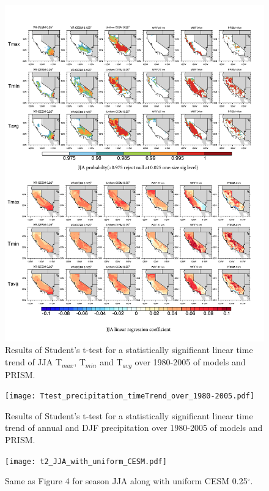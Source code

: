 \documentclass[draft,ms]{agutexSI}
\begin{document}
\begin{figure}
\begin{center}
\includegraphics[width=6in]{Ttest_JJAT2_timeTrend_over_1980-2005.pdf}
\caption{Results of Student's t-test for a statistically significant linear time trend of JJA T$_{max}$, T$_{min}$ and T$_{avg}$ over 1980-2005 of models and PRISM.}
\end{center}
\end{figure}

\begin{figure}
\begin{center}
\texttt{[image: Ttest\_precipitation\_timeTrend\_over\_1980-2005.pdf]}
\caption{Results of Student's t-test for a statistically significant linear time trend of annual and DJF precipitation over 1980-2005 of models and PRISM.}
\end{center}
\end{figure}

\begin{figure}
\begin{center}
\texttt{[image: t2\_JJA\_with\_uniform\_CESM.pdf]}
\caption{Same as Figure 4 for season JJA along with uniform CESM 0.25$^\circ$.}
\end{center}
\end{figure}
\end{document}
